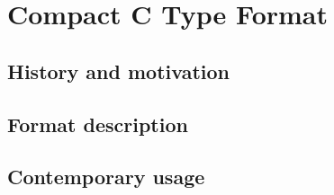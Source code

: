 \chapter{Compact C Type Format}

\section{History and motivation}
\section{Format description}
\section{Contemporary usage}

